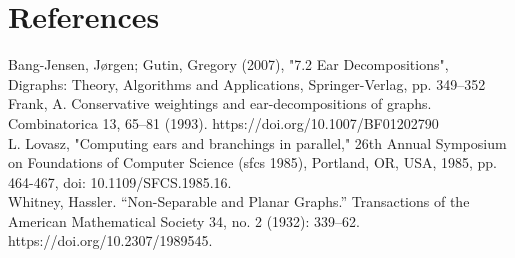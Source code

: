 \documentclass{article}
\begin{document}
\section*{References}
Bang-Jensen, Jørgen; Gutin, Gregory (2007), "7.2 Ear Decompositions", Digraphs: Theory, Algorithms and Applications, Springer-Verlag, pp. 349–352
\\ Frank, A. Conservative weightings and ear-decompositions of graphs. Combinatorica 13, 65–81 (1993). https://doi.org/10.1007/BF01202790
\\ L. Lovasz, "Computing ears and branchings in parallel," 26th Annual Symposium on Foundations of Computer Science (sfcs 1985), Portland, OR, USA, 1985, pp. 464-467, doi: 10.1109/SFCS.1985.16.
\\Whitney, Hassler. “Non-Separable and Planar Graphs.” Transactions of the American Mathematical Society 34, no. 2 (1932): 339–62. https://doi.org/10.2307/1989545.
\end{document}
